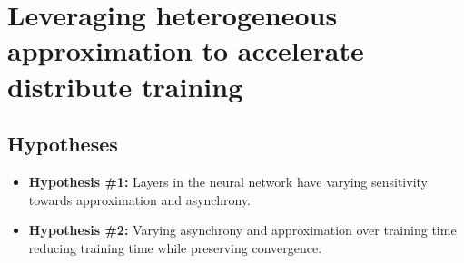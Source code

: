 \section{Leveraging heterogeneous approximation to accelerate distribute training}
\subsection{Hypotheses}
\begin{itemize}
\item \textbf{Hypothesis \#1:} Layers in the neural network have varying sensitivity towards approximation and asynchrony.
\item \textbf{Hypothesis \#2:} Varying asynchrony and approximation over training time reducing training time while preserving convergence.
\end{itemize}

